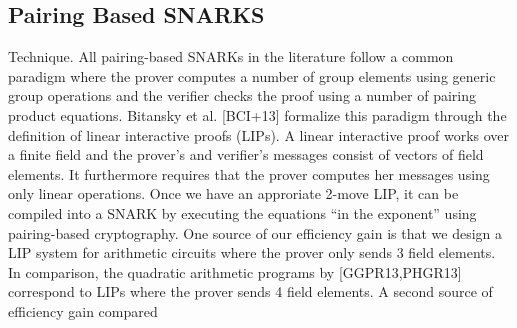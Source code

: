 \subsection{Pairing Based SNARKS}
Technique. All pairing-based SNARKs in the literature follow a common paradigm
where the prover computes a number of group elements using generic group operations
and the verifier checks the proof using a number of pairing product equations. Bitansky
et al. [BCI+13] formalize this paradigm through the definition of linear interactive proofs
(LIPs). A linear interactive proof works over a finite field and the prover’s and verifier’s
messages consist of vectors of field elements. It furthermore requires that the prover
computes her messages using only linear operations. Once we have an approriate 2-move
LIP, it can be compiled into a SNARK by executing the equations “in the exponent”
using pairing-based cryptography. One source of our efficiency gain is that we design
a LIP system for arithmetic circuits where the prover only sends 3 field elements. In
comparison, the quadratic arithmetic programs by [GGPR13,PHGR13] correspond to
LIPs where the prover sends 4 field elements.
A second source of efficiency gain compared


